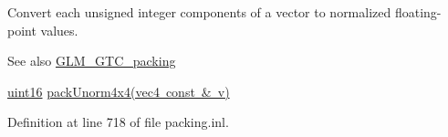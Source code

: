 Convert each unsigned integer components of a vector to normalized floating-\/point values.

\begin{DoxySeeAlso}{See also}
\mbox{\hyperlink{group__gtc__packing}{G\+L\+M\+\_\+\+G\+T\+C\+\_\+packing}} 

\mbox{\hyperlink{group__gtc__type__precision_gad8c2939e1fdd8e5828b31d95c52255d5}{uint16}} \mbox{\hyperlink{group__gtc__packing_gad493c9f130e91dd8a4b360b05dcea573}{pack\+Unorm4x4(vec4 const \& v)}} 
\end{DoxySeeAlso}


Definition at line 718 of file packing.\+inl.

